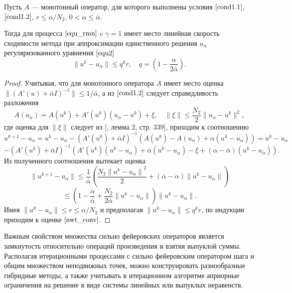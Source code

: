 \begin{theorem}\label{teo2.1} Пусть $A$ --- монотонный оператор, для которого выполнены условия $\eqref{cond1.1}$, $\eqref{cond1.2}$, $r\le \alpha/N_2$, $0<\alpha \le \bar\alpha$. 
	
	Тогда для процесса $\eqref{equ_rmn}$ c $\gamma=1$ имеет место линейная скорость сходимости метода при аппроксимации единственного решения $u_\alpha$ регуляризованного уравнения $\eqref{equ2}$
	\begin{equation}\label{nwt_conv}
	\| u^k-u_\alpha \| \le q^kr, \quad q=(1-\frac{\alpha}{2\bar\alpha}).
	\end{equation}
\end{theorem}
\begin{proof} 
Учитывая, что для монотонного оператора $A$ имеет место оценка $\| (A'(u)+\bar\alpha I)^{-1} \| \le 1/\bar\alpha$, а из $\eqref{cond1.2}$ следует справедливость разложения
$$
A(u_\alpha)=A(u^k)+A'(u^k)(u_\alpha-u^k)+\xi, \quad \|\xi\|\le \frac{N_2}{2}\|u_\alpha-u^k\|^2,
$$
где оценка для $\|\xi\|$ следует из [\cite{Tre1993}, лемма 2, стр. 339], приходим к соотношению 
$$
u^{k+1}-u_\alpha=u^k-u_\alpha-(A'(u^k)+\bar\alpha I)^{-1}(A(u^k)-A(u_\alpha)+\alpha(u^k-u_\alpha))=u^k- u_\alpha$$ $$-(A'(u^k)+\bar\alpha I)^{-1}(A'(u^k)(u^k-u_\alpha)+\bar\alpha(u^k-u_\alpha)-\xi+(\alpha-\bar\alpha)(u^k-u_\alpha)). $$
Из полученного соотношения вытекает оценка
$$
\|u^{k+1}-u_\alpha\|\le\frac{1}{\bar\alpha}\left(\frac{N_2{\|u^{k}-u_\alpha\|}^2}{2}+(\bar\alpha-\alpha)\|u^k-u_\alpha\|\right)$$
$$\le\left(1-\frac{\alpha}{\bar\alpha}+\frac{N_2}{2\bar\alpha}\|u^k-u_\alpha\|\right)\|u^k-u_\alpha\|.$$
Имея $\|u^0-u_\alpha\|\le r \le \alpha/N_2$ и предполагая $\| u^{k}-u_\alpha \|\le q^kr$, по индукции приходим к оценке $\eqref{nwt_conv}$.
\end{proof}

Важным свойством множества сильно фейеровских операторов является замкнутость относительно операций произведения и взятия выпуклой суммы. Располагая итерационными процессами с сильно фейеровским оператором шага и общим множеством неподвижных точек, можно конструировать разнообразные гибридные методы, а также учитывать в итерационном алгоритме априорные ограничения на решение в виде системы линейных или выпуклых неравенств.


